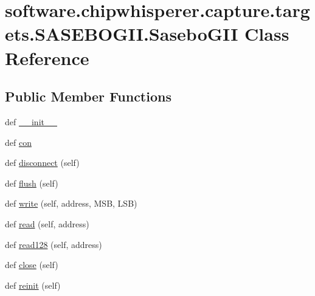 \hypertarget{classsoftware_1_1chipwhisperer_1_1capture_1_1targets_1_1SASEBOGII_1_1SaseboGII}{}\section{software.\+chipwhisperer.\+capture.\+targets.\+S\+A\+S\+E\+B\+O\+G\+I\+I.\+Sasebo\+G\+I\+I Class Reference}
\label{classsoftware_1_1chipwhisperer_1_1capture_1_1targets_1_1SASEBOGII_1_1SaseboGII}
\subsection*{Public Member Functions}
\begin{DoxyCompactItemize}
\item 
def \hyperlink{classsoftware_1_1chipwhisperer_1_1capture_1_1targets_1_1SASEBOGII_1_1SaseboGII_a7249015de2751cbc628449b215b3c2d2}{\+\_\+\+\_\+init\+\_\+\+\_\+}
\item 
def \hyperlink{classsoftware_1_1chipwhisperer_1_1capture_1_1targets_1_1SASEBOGII_1_1SaseboGII_a4fbb8ef06e51ac892af0b60518042f26}{con}
\item 
def \hyperlink{classsoftware_1_1chipwhisperer_1_1capture_1_1targets_1_1SASEBOGII_1_1SaseboGII_af383d499375d91fa76cac7985440bfad}{disconnect} (self)
\item 
def \hyperlink{classsoftware_1_1chipwhisperer_1_1capture_1_1targets_1_1SASEBOGII_1_1SaseboGII_adedabe387459ee98c41e687a29053582}{flush} (self)
\item 
def \hyperlink{classsoftware_1_1chipwhisperer_1_1capture_1_1targets_1_1SASEBOGII_1_1SaseboGII_ae0a80592228db71b3856eb6ad213e23a}{write} (self, address, M\+S\+B, L\+S\+B)
\item 
def \hyperlink{classsoftware_1_1chipwhisperer_1_1capture_1_1targets_1_1SASEBOGII_1_1SaseboGII_a851ee055698fb2cde89f927c462431c4}{read} (self, address)
\item 
def \hyperlink{classsoftware_1_1chipwhisperer_1_1capture_1_1targets_1_1SASEBOGII_1_1SaseboGII_a641ce1000e9d91ee6596d1529c98c9b1}{read128} (self, address)
\item 
def \hyperlink{classsoftware_1_1chipwhisperer_1_1capture_1_1targets_1_1SASEBOGII_1_1SaseboGII_a30692608f46a3660b3efbf7003da3cde}{close} (self)
\item 
def \hyperlink{classsoftware_1_1chipwhisperer_1_1capture_1_1targets_1_1SASEBOGII_1_1SaseboGII_aaeb99332fe37a46d2bb8eec1ced73fa9}{reinit} (self)

\end{DoxyCompactItemize}
